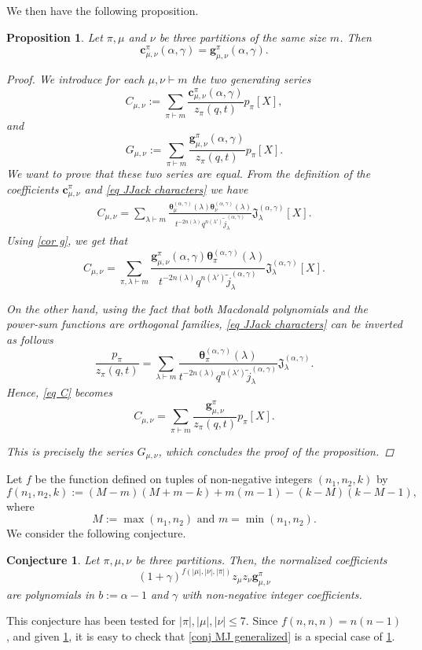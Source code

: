 \documentclass[12pt]{amsart}
\newtheorem{prop}[thm]{Proposition}
\newtheorem{conj}{Conjecture}
\theoremstyle{remark}
\newcommand{\bfc}{\boldsymbol{c}}
\newcommand{\bfg}{\boldsymbol{g}}
\newcommand{\MchJack}{{\boldsymbol{\theta}}^{(\alpha,\gamma)}}
\newcommand{\JJack}{{\mathfrak J}^{(\alpha,\gamma)}}
\newcommand{\normJt}{\widetilde{j}^{(\alpha,\gamma)}}
\begin{document}
We then have the following proposition.

\begin{prop}\label{prop g c}
    Let  $\pi,\mu$ and $\nu$ be three partitions of the same size $m$. Then 
    $$\bfc^\pi_{\mu,\nu}(\alpha,\gamma)=\bfg^\pi_{\mu,\nu}(\alpha,\gamma).$$
    \begin{proof}

We introduce for each $\mu,\nu\vdash m$ the two generating series
$$C_{\mu,\nu}:=\sum_{\pi\vdash m}\frac{\bfc^\pi_{\mu,\nu}(\alpha,\gamma)}{z_\pi(q,t)}p_\pi[X],$$
and 
$$G_{\mu,\nu}:=\sum_{\pi\vdash m}\frac{\bfg^\pi_{\mu,\nu}(\alpha,\gamma)}{z_\pi(q,t)}p_\pi[X].$$
We want to prove that these two series are equal.
From the definition of the coefficients $\bfc^\pi_{\mu,\nu}$ and \cref{eq JJack characters} we have
\begin{align*}
    C_{\mu,\nu}
    =\sum_{\lambda\vdash m}\frac{\MchJack_\mu(\lambda) \MchJack_\nu(\lambda)}{t^{-2n(\lambda)} q^{n(\lambda')}\normJt_\lambda}\JJack_\lambda[X].
\end{align*}
    Using \cref{cor g}, we get that 
    \begin{equation}\label{eq C}
      C_{\mu,\nu}=\sum_{\pi,\lambda\vdash m} \frac{\bfg^\pi_{\mu,\nu}(\alpha,\gamma)\MchJack_\pi(\lambda)}{t^{-2n(\lambda)} q^{n(\lambda')}\normJt_\lambda}\JJack_\lambda[X].
    \end{equation}
    
    On the other hand, using the fact that both Macdonald polynomials and the power-sum functions are orthogonal families, \cref{eq JJack characters} can be inverted as follows
    $$\frac{p_\pi}{z_\pi(q,t)}=\sum_{\lambda\vdash m}\frac{\MchJack_\pi(\lambda)}{t^{-2n(\lambda)}q^{n(\lambda')}\normJt_\lambda}\JJack_\lambda.$$
    Hence, \cref{eq C} becomes 
    $$C_{\mu,\nu}=\sum_{\pi\vdash m}\frac{\bfg^\pi_{\mu,\nu}}{z_\pi(q,t)}p_\pi[X].$$
    
    This is precisely the series $G_{\mu,\nu}$, which concludes the proof of the proposition.
\end{proof}
\end{prop}

Let $f$ be the function defined on tuples of non-negative integers $(n_1,n_2,k)$ by
$$f(n_1,n_2,k):=(M-m)(M+m-k)+m(m-1)-(k-M)(k-M-1),$$
where 
$$M:=\max(n_1,n_2) \text{ and } m=\min(n_1,n_2).$$
We consider the following conjecture.
\begin{conj}\label{conj structure coeff}
Let $\pi,\mu,\nu$ be three partitions.
    Then, the normalized coefficients 
    $$(1+\gamma)^{f(|\mu|,|\nu|,|\pi|)} z_\mu z_\nu \bfg^\pi_{\mu,\nu}$$
    are polynomials in $b:=\alpha-1$ and $\gamma$ with non-negative integer coefficients.
\end{conj}
This conjecture has been tested for $|\pi|,|\mu|,|\nu|\leq 7$. Since $f(n,n,n)=n(n-1)$, and given \cref{prop g c}, it is easy to check that \cref{conj MJ generalized} is a special case of \cref{conj structure coeff}.
\end{document}
